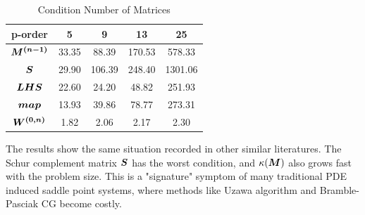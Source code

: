 \begin{table}[H]
	\centering
	\caption{Condition Number of Matrices}
	\label{chartcond}
	\begin{tabular}{|c|c|c|c|c|} 
		\hline
		p-order & 5& 9 & 13 & 25 \\ [0.5ex] \hline 
		$\boldsymbol{M^{(n-1)}}$ & 33.35 & 88.39 & 170.53 & 578.33 \\[0.5ex] \hline
		$\boldsymbol{S}$ & 29.90 & 106.39 & 248.40 & 1301.06 \\[0.5ex] \hline
		$\boldsymbol{LHS}$ &22.60 & 24.20 & 48.82 & 251.93 \\[0.5ex] \hline
		$\boldsymbol{map}$ & 13.93 & 39.86 & 78.77 & 273.31 \\[0.5ex]\hline
		$\boldsymbol{W^{(0,n)}}$ & 1.82 & 2.06 & 2.17 & 2.30 \\ 
		\hline
	\end{tabular}
\end{table}
The results show the same situation recorded in other similar literatures. The Schur complement matrix $\boldsymbol{S}$ has the worst condition, and $\kappa(\boldsymbol{M})$ also grows fast with the problem size. This is a "signature" symptom of many traditional PDE induced saddle point systems, where methods like Uzawa algorithm and Bramble-Pasciak CG become costly. \\
   
